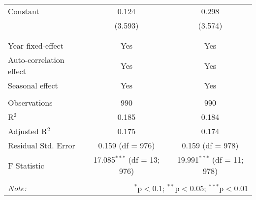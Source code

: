 \begin{table}[!htbp]
\begin{tabular}{@{\extracolsep{5pt}}lcc}
 Constant & 0.124 & 0.298 \\ 
  & (3.593) & (3.574) \\ 
  & & \\ 
\hline \\[-1.8ex] 
Year fixed-effect & Yes & Yes \\ 
Auto-correlation effect & Yes & Yes \\ 
Seasonal effect & Yes & Yes \\ 
\hline \\[-1.8ex] 
Observations & 990 & 990 \\ 
R$^{2}$ & 0.185 & 0.184 \\ 
Adjusted R$^{2}$ & 0.175 & 0.174 \\ 
Residual Std. Error & 0.159 (df = 976) & 0.159 (df = 978) \\ 
F Statistic & 17.085$^{***}$ (df = 13; 976) & 19.991$^{***}$ (df = 11; 978) \\ 
\hline 
\hline \\[-1.8ex] 
\textit{Note:}  & \multicolumn{2}{r}{$^{*}$p$<$0.1; $^{**}$p$<$0.05; $^{***}$p$<$0.01} \\ 
\end{tabular} 
\end{table} 
